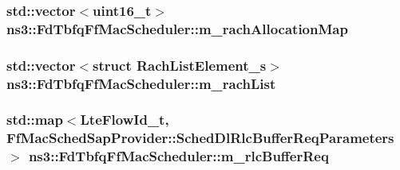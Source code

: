 \subsubsection[{\texorpdfstring{m\+\_\+rach\+Allocation\+Map}{m_rachAllocationMap}}]{\setlength{\rightskip}{0pt plus 5cm}std\+::vector$<$uint16\+\_\+t$>$ ns3\+::\+Fd\+Tbfq\+Ff\+Mac\+Scheduler\+::m\+\_\+rach\+Allocation\+Map\hspace{0.3cm}{\ttfamily [private]}}\hypertarget{classns3_1_1FdTbfqFfMacScheduler_a046aaad84777461862179b30893e38ec}{}\label{classns3_1_1FdTbfqFfMacScheduler_a046aaad84777461862179b30893e38ec}
\subsubsection[{\texorpdfstring{m\+\_\+rach\+List}{m_rachList}}]{\setlength{\rightskip}{0pt plus 5cm}std\+::vector$<$struct {\bf Rach\+List\+Element\+\_\+s}$>$ ns3\+::\+Fd\+Tbfq\+Ff\+Mac\+Scheduler\+::m\+\_\+rach\+List\hspace{0.3cm}{\ttfamily [private]}}\hypertarget{classns3_1_1FdTbfqFfMacScheduler_a0d2d08dad69997d048c8d35b5dac76e7}{}\label{classns3_1_1FdTbfqFfMacScheduler_a0d2d08dad69997d048c8d35b5dac76e7}
\subsubsection[{\texorpdfstring{m\+\_\+rlc\+Buffer\+Req}{m_rlcBufferReq}}]{\setlength{\rightskip}{0pt plus 5cm}std\+::map$<${\bf Lte\+Flow\+Id\+\_\+t}, {\bf Ff\+Mac\+Sched\+Sap\+Provider\+::\+Sched\+Dl\+Rlc\+Buffer\+Req\+Parameters}$>$ ns3\+::\+Fd\+Tbfq\+Ff\+Mac\+Scheduler\+::m\+\_\+rlc\+Buffer\+Req\hspace{0.3cm}{\ttfamily [private]}}\hypertarget{classns3_1_1FdTbfqFfMacScheduler_a1de1056077db96c215eb47ef724e1167}{}\label{classns3_1_1FdTbfqFfMacScheduler_a1de1056077db96c215eb47ef724e1167}
